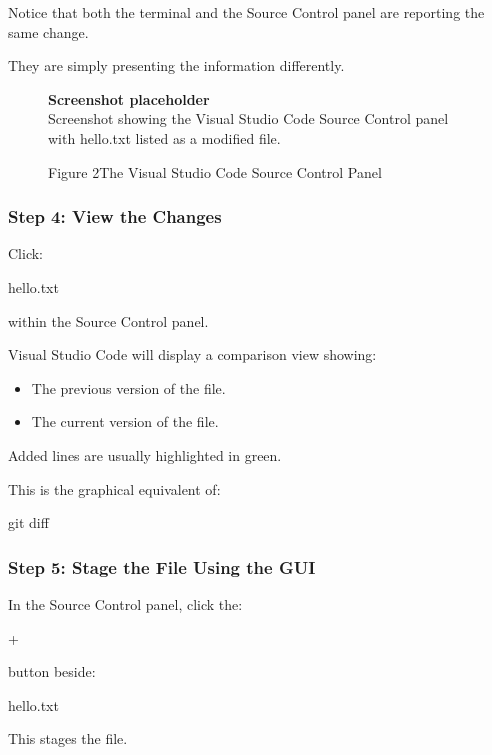 \documentclass{csc2059practical}
\begin{document}
Notice that both the terminal and the Source Control panel are reporting the same change.

They are simply presenting the information differently.


\begin{figure}[htbp]
\centering
\begin{tcolorbox}[
  enhanced,
  colback=CSCGray,
  colframe=CSCBlue!45!black,
  boxrule=0.6pt,
  arc=2mm,
  width=0.9\linewidth,
  left=5mm,right=5mm,top=5mm,bottom=5mm,
  halign=center
]
{\sffamily\bfseries Screenshot placeholder}\\[2mm]
{\small Screenshot showing the Visual Studio Code Source Control panel with hello.txt listed as a modified file.}
\end{tcolorbox}
\caption{Figure 2The Visual Studio Code Source Control Panel}
\end{figure}
\subsubsection{Step 4: View the Changes}
Click:

\begin{terminalplain}
hello.txt
\end{terminalplain}
within the Source Control panel.

Visual Studio Code will display a comparison view showing:

\begin{itemize}
  \item The previous version of the file.
  \item The current version of the file.
\end{itemize}
Added lines are usually highlighted in green.

This is the graphical equivalent of:

\begin{terminalplain}
git diff
\end{terminalplain}
\subsubsection{Step 5: Stage the File Using the GUI}
In the Source Control panel, click the:

+

button beside:

\begin{terminalplain}
hello.txt
\end{terminalplain}
This stages the file.
\end{document}
